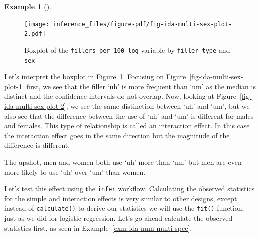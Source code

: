 \documentclass[
  letterpaper,
  DIV=11,
  numbers=noendperiod]{scrreprt}
\theoremstyle{definition}
\newtheorem{example}{Example}[chapter]
\theoremstyle{remark}
\begin{document}
\begin{example}[]
\begin{figure}[H]
\begin{minipage}{0.50\linewidth}
{\texttt{[image: inference\_files/figure-pdf/fig-ida-multi-sex-plot-2.pdf]}

}


\end{minipage}%

\caption{\label{fig-ida-multi-sex-plot}Boxplot of the
\texttt{fillers\_per\_100\_log} variable by \texttt{filler\_type} and
\texttt{sex}}

\end{figure}%

\end{example}

Let's interpret the boxplot in Figure~\ref{fig-ida-multi-sex-plot}.
Focusing on Figure~\ref{fig-ida-multi-sex-plot-1} first, we see that the
filler `uh' is more frequent than `um' as the median is distinct and the
confidence intervals do not overlap. Now, looking at
Figure~\ref{fig-ida-multi-sex-plot-2}, we see the same distinction
between `uh' and `um', but we also see that the difference between the
use of `uh' and `um' is different for males and females. This type of
relationship is called an interaction effect. In this case the
interaction effect goes in the same direction but the magnitude of the
difference is different.

The upshot, men and women both use `uh' more than `um' but men are even
more likely to use `uh' over `um' than women.

Let's test this effect using the \texttt{infer} workflow. Calculating
the observed statistics for the simple and interaction effects is very
similar to other designs, except instead of \texttt{calculate()} to
derive our statistics we will use the \texttt{fit()} function, just as
we did for logistic regression. Let's go ahead calculate the observed
statistics first, as seen in Example~\ref{exm-ida-num-multi-spec}.
\end{document}
